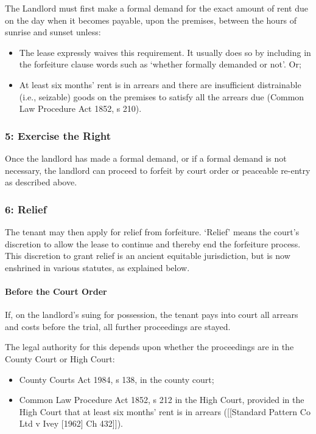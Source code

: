 \documentclass[
]{article}
\providecommand{\tightlist}{%
  \setlength{\itemsep}{0pt}\setlength{\parskip}{0pt}}
\begin{document}
The Landlord must first make a formal demand for the exact amount of
rent due on the day when it becomes payable, upon the premises, between
the hours of sunrise and sunset unless:

\begin{itemize}
\tightlist
\item
  The lease expressly waives this requirement. It usually does so by
  including in the forfeiture clause words such as `whether formally
  demanded or not'. Or;
\item
  At least six months' rent is in arrears and there are insufficient
  distrainable (i.e., seizable) goods on the premises to satisfy all the
  arrears due (Common Law Procedure Act 1852, s 210).
\end{itemize}

\hypertarget{exercise-the-right}{%
\subsubsection{5: Exercise the Right}\label{exercise-the-right}}

Once the landlord has made a formal demand, or if a formal demand is not
necessary, the landlord can proceed to forfeit by court order or
peaceable re-entry as described above.

\hypertarget{relief}{%
\subsubsection{6: Relief}\label{relief}}

The tenant may then apply for relief from forfeiture. `Relief' means the
court's discretion to allow the lease to continue and thereby end the
forfeiture process. This discretion to grant relief is an ancient
equitable jurisdiction, but is now enshrined in various statutes, as
explained below.

\hypertarget{before-the-court-order}{%
\paragraph{Before the Court Order}\label{before-the-court-order}}

If, on the landlord's suing for possession, the tenant pays into court
all arrears and costs before the trial, all further proceedings are
stayed.

The legal authority for this depends upon whether the proceedings are in
the County Court or High Court:

\begin{itemize}
\tightlist
\item
  County Courts Act 1984, s 138, in the county court;
\item
  Common Law Procedure Act 1852, s 212 in the High Court, provided in
  the High Court that at least six months' rent is in arrears
  ({[}{[}Standard Pattern Co Ltd v Ivey {[}1962{]} Ch 432{]}{]}).
\end{itemize}
\end{document}
